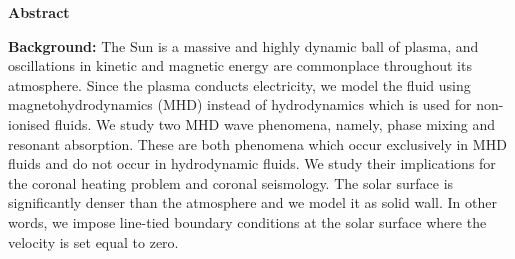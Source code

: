\thispagestyle{plain}
\begin{center}
    
    
    
    \textbf{Abstract}
\end{center}

\begin{spacing}{1.1}

\noindent 

\textbf{Background:} 
The Sun is a massive and highly dynamic ball of plasma, and oscillations in kinetic and magnetic energy are commonplace throughout its atmosphere. Since the plasma conducts electricity, we model the fluid using magnetohydrodynamics (MHD) instead of hydrodynamics which is used for non-ionised fluids. We study two MHD wave phenomena, namely, phase mixing and resonant absorption. These are both phenomena which occur exclusively in MHD fluids and do not occur in hydrodynamic fluids. We study their implications for the coronal heating problem and coronal seismology. The solar surface is significantly denser than the atmosphere and we model it as solid wall. In other words, we impose line-tied boundary conditions at the solar surface where the velocity is set equal to zero.


\end{spacing}
